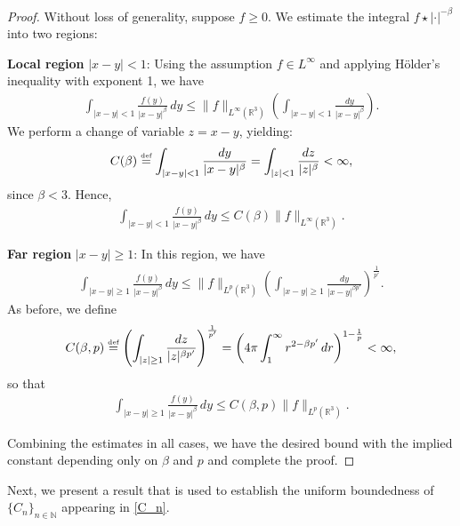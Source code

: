 \documentclass[reqno,11pt,final]{amsart}
\theoremstyle{plain}
\numberwithin{equation}{section}
\numberwithin{theorem}{section}
\newcommand{\eqdef }{\overset{\mbox{\tiny{def}}}{=}}
\begin{document}
\begin{proof}Without loss of generality, suppose $f\ge0$. We estimate the integral  $f\star |\cdot|^{-\beta}$ into two regions:

\textbf{Local region }$|x-y|<1$: Using the assumption $f\in L^\infty$ and applying H\"older's inequality with exponent 1, we have
\begin{align*}
\int_{|x-y|<1}\frac{f(y)}{|x-y|^\beta}\,dy \le \lVert f\rVert_{L^\infty(\mathbb{R}^3)}\left(\int_{|x-y|<1} \frac{dy}{|x-y|^{\beta }}\right).
\end{align*}We perform a change of variable $z=x-y$, yielding:
\begin{align}\label{p>1 est}
C(\beta) \eqdef\int_{|x-y|<1}\frac{dy}{|x-y|^\beta} =  \int_{|z|<1} \frac{dz}{|z|^{\beta }}<\infty,
\end{align}since $\beta<3$. Hence,
\begin{align*}
\int_{|x-y|<1}\frac{f(y)}{|x-y|^\beta}\,dy \le C(\beta) \lVert f\rVert_{L^\infty(\mathbb{R}^3)}.
\end{align*}

\textbf{Far region }$|x-y|\ge1$: In this region, we have
\begin{align*}
\int_{|x-y|\ge1} \frac{f(y)}{|x-y|^\beta}\,dy \le \lVert f\rVert_{L^p(\mathbb{R}^3)} \left(\int_{|x-y|\ge1} \frac{dy}{|x-y|^{\beta p'}}\right)^{\frac{1}{p'}}.
\end{align*}As before, we define
\begin{align*}
C(\beta,p) \eqdef  \left(\int_{|z|\ge1} \frac{dz}{|z|^{\beta p'}}\right)^{\frac{1}{p'}} = \left(4\pi\int_1^\infty r^{2-\beta p'}\,dr\right)^{1-\frac{1}{p}} <\infty,
\end{align*}so that
\begin{align*}
\int_{|x-y|\ge1} \frac{f(y)}{|x-y|^\beta}\,dy \le C(\beta,p) \lVert f\rVert_{L^p(\mathbb{R}^3)}.
\end{align*}

Combining the estimates in all cases, we have the desired bound with the implied constant depending only on $\beta$ and $p$ and complete the proof.
\end{proof}

Next, we present a result that is used to establish the uniform boundedness of $\{C_n\}_{n\in\mathbb{N}}$ appearing in \eqref{C_n}.
\end{document}
